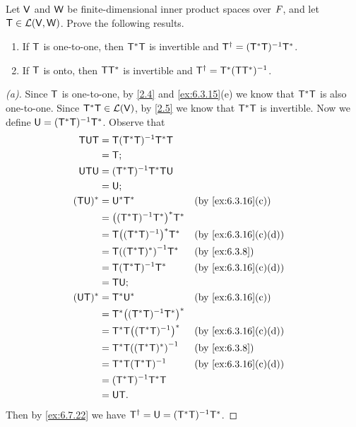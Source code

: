 \begin{ex}\label{ex:6.7.25}
  Let \(\mathsf{V}\) and \(\mathsf{W}\) be finite-dimensional inner product spaces over \(\mathit{F}\), and let \(\mathsf{T} \in \mathcal{L}(\mathsf{V}, \mathsf{W})\).
  Prove the following results.
  \begin{enumerate}
    \item If \(\mathsf{T}\) is one-to-one, then \(\mathsf{T}^* \mathsf{T}\) is invertible and \(\mathsf{T}^{\dag} = (\mathsf{T}^* \mathsf{T})^{-1} \mathsf{T}^*\).
    \item If \(\mathsf{T}\) is onto, then \(\mathsf{T} \mathsf{T}^*\) is invertible and \(\mathsf{T}^{\dag} = \mathsf{T}^* (\mathsf{T} \mathsf{T}^*)^{-1}\).
  \end{enumerate}
\end{ex}

\begin{proof}[(a)]
  Since \(\mathsf{T}\) is one-to-one, by \cref{2.4} and \cref{ex:6.3.15}(e) we know that \(\mathsf{T}^* \mathsf{T}\) is also one-to-one.
  Since \(\mathsf{T}^* \mathsf{T} \in \mathcal{L}(\mathsf{V})\), by \cref{2.5} we know that \(\mathsf{T}^* \mathsf{T}\) is invertible.
  Now we define \(\mathsf{U} = (\mathsf{T}^* \mathsf{T})^{-1} \mathsf{T}^*\).
  Observe that
  \begin{align*}
    \T \U \T  & = \T (\T^* \T)^{-1} \T^* \T                                \\
              & = \T;                                                      \\
    \U \T \U  & = (\T^* \T)^{-1} \T^* \T \U                                \\
              & = \U;                                                      \\
    (\T \U)^* & = \U^* \T^*                       &  & \by{ex:6.3.16}[c]   \\
              & = \pa{(\T^* \T)^{-1} \T^*}^* \T^*                          \\
              & = \T \pa{(\T^* \T)^{-1}}^* \T^*   &  & \by{ex:6.3.16}[c,d] \\
              & = \T \pa{(\T^* \T)^*}^{-1} \T^*   &  & \by{ex:6.3.8}       \\
              & = \T (\T^* \T)^{-1} \T^*          &  & \by{ex:6.3.16}[c,d] \\
              & = \T \U;                                                   \\
    (\U \T)^* & = \T^* \U^*                       &  & \by{ex:6.3.16}[c]   \\
              & = \T^* \pa{(\T^* \T)^{-1} \T^*}^*                          \\
              & = \T^* \T \pa{(\T^* \T)^{-1}}^*   &  & \by{ex:6.3.16}[c,d] \\
              & = \T^* \T \pa{(\T^* \T)^*}^{-1}   &  & \by{ex:6.3.8}       \\
              & = \T^* \T (\T^* \T)^{-1}          &  & \by{ex:6.3.16}[c,d] \\
              & = (\T^* \T)^{-1} \T^* \T                                   \\
              & = \U \T.
  \end{align*}
  Then by \cref{ex:6.7.22} we have \(\mathsf{T}^{\dag} = \mathsf{U} = (\mathsf{T}^* \mathsf{T})^{-1} \mathsf{T}^*\).
\end{proof}

